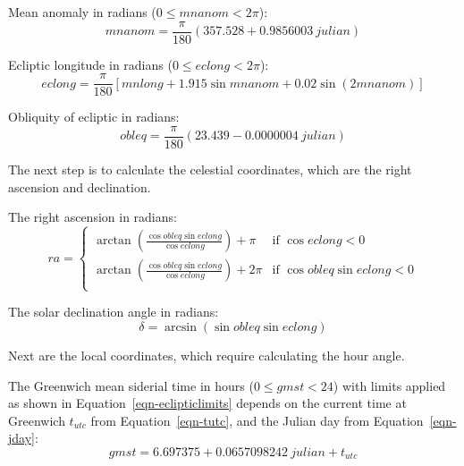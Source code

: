 \documentclass[12pt,letterpaper]{article}
\begin{document}
Mean anomaly in radians ($0\leq\mathit{mnanom}<2\pi$):
\begin{equation}\label{eqn-mnanom}
\mathit{mnanom} = \frac{\pi}{180}\left(357.528 + 0.9856003~\mathit{julian}\right)
\end{equation}

Ecliptic longitude in radians ($0\leq\mathit{eclong}<2\pi$):
\begin{equation}\label{eqn-eclong}
\mathit{eclong} = \frac{\pi}{180}\left[\mathit{mnlong} + 1.915\sin \mathit{mnanom} + 0.02\sin(2\mathit{mnanom})\right]
\end{equation}

Obliquity of ecliptic in radians:
\begin{equation}\label{eqn-oblqec}
\mathit{obleq} = \frac{\pi}{180}\left(23.439 - 0.0000004~\mathit{julian}\right)
\end{equation}

The next step is to calculate the celestial coordinates, which are the right ascension and declination.

The right ascension in radians:
\begin{equation}
\mathit{ra} = \left\{
\begin{array}{ll}
\arctan\left(  \frac{ \cos\mathit{\mathit{obleq}}\sin{\mathit{eclong}}}{\cos\mathit{eclong}}  \right) + \pi & \text{if $\cos\mathit{eclong}<0$}\\
\arctan\left(  \frac{ \cos\mathit{\mathit{obleq}}\sin{\mathit{eclong}}}{\cos\mathit{eclong}}  \right) + 2\pi & \text{if $\cos\mathit{obleq}\sin\mathit{eclong}<0$}\\
\end{array}
\right.
\end{equation}

The solar declination angle in radians:
\begin{equation}\label{eqn-dec}
\delta = \arcsin \left( \sin \mathit{obleq} \sin \mathit{eclong} \right)
\end{equation}

Next are the local coordinates, which require calculating the hour angle. 

The Greenwich mean siderial time in hours ($0\leq\mathit{gmst}<24$) with limits applied as shown in Equation~\ref{eqn-eclipticlimits} depends on the current time at Greenwich $t_{utc}$ from Equation~\ref{eqn-tutc}, and the Julian day from Equation~\ref{eqn-jday}:
\begin{equation}
\mathit{gmst}= 6.697375 + 0.0657098242~\mathit{julian} + t_{\mathit{utc}}
\end{equation}
\end{document}
